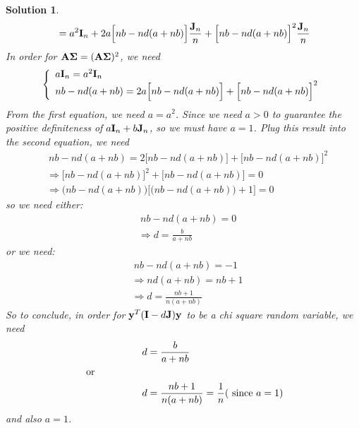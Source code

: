 \documentclass[11pt]{article}
\newtheorem{sol}{Solution}
\begin{document}
\begin{sol}
\begin{align*}
		&= a^2{\bf I}_n + 2a \Big[nb - nd(a + nb)\Big]\frac{{\bf J}_n}{n} + \Big[nb - nd(a + nb)\Big]^2\frac{{\bf J}_n}{n}\\
	\end{align*}
	In order for ${\bf A}{\bf \Sigma}= ({\bf A}{\bf \Sigma})^2$, we need
	\begin{align*}
		\left\{\begin{array}{l} a{\bf I}_n = a^2{\bf I}_n\\ nb - nd(a + nb) = 2a\Big[nb - nd(a + nb)\Big] + \Big[nb - nd(a + nb)\Big]^2\end{array}\right.
	\end{align*}
	From the first equation, we need $a = a^2$. Since we need $ a>0$ to guarantee the positive definiteness of $a{\bf I}_n + b{\bf J}_n$, so we must have $a = 1$. Plug this result into the second equation, we need
	\begin{align*}
		&\ nb - nd(a + nb) = 2\Big[nb - nd(a + nb)\Big] + \Big[nb - nd(a + nb)\Big]^2\\
		&\Longrightarrow \Big[nb - nd(a + nb)\Big]^2 + \Big[nb - nd(a + nb)\Big] = 0\\
		&\Longrightarrow \Big(nb - nd(a + nb)\Big)\Big[\Big(nb - nd(a + nb)\Big) + 1\Big] = 0
	\end{align*}
	so we need either:
	\begin{align*}
		&\ nb - nd(a + nb) = 0\\
		&\Longrightarrow d = \frac{b}{a + nb}
	\end{align*}
	or we need:
	\begin{align*}
		&\ nb - nd(a + nb) = -1\\
		&\Longrightarrow nd(a + nb) = nb + 1\\
		&\Longrightarrow d = \frac{nb + 1}{n(a + nb)}
	\end{align*}
	So to conclude, in order for ${\bf y}^T({\bf I} - d{\bf J}){\bf y}$ to be a chi square random variable, we need
	\begin{align*}
		&\ \hskip 2cm  d = \frac{b}{a + nb}\\
		&\text{ or }\\
		&\ \hskip 2cm  d = \frac{nb + 1}{n(a + nb)} = \frac{1}{n} (\text{ since } a = 1)
	\end{align*}
	and also $a = 1$.
 \end{sol} 
\end{document}
